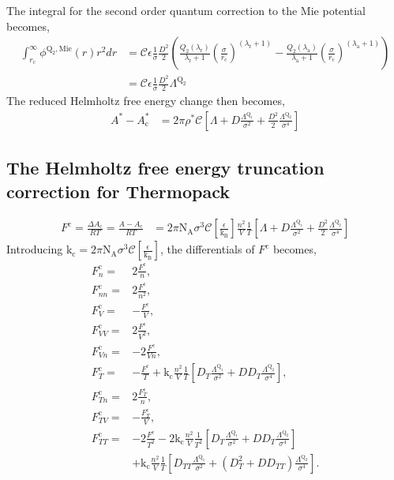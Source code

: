 \documentclass[english]{../thermomemo/thermomemo}
\newcommand*{\lb}{\left(}
\newcommand*{\rb}{\right)}
\newcommand{\mie}{\text{Mie}\xspace}
\newcommand{\lama}{\ensuremath{{\lambda_{\text{a}}}}\xspace}
\newcommand{\lamr}{\ensuremath{{\lambda_{\text{r}}}}\xspace}
\newcommand{\NA}{\ensuremath{\text{N}_{\text{A}}}\xspace}
\newcommand{\KB}{\ensuremath{\text{k}_{\text{B}}}\xspace}
\newcommand{\cut}{\ensuremath{\text{c}}\xspace}
\newcommand{\Qone}{\ensuremath{\text{Q}_1}\xspace}
\newcommand{\Qtwo}{\ensuremath{\text{Q}_2}\xspace}
\newcommand{\kF}{\ensuremath{\text{k}_\text{c}}\xspace}
\begin{document}
The integral for the second order quantum correction to the Mie potential becomes,
\begin{align}
  \label{eq:i_mie_q2}
  \int_{r_\cut}^\infty \phi^{\Qtwo,\mie}\lb r\rb r^2 dr &= \mathcal{C}\epsilon \frac{1}{\sigma} \frac{D^2}{2}
  \lb \frac{Q_2\lb\lamr\rb}{\lamr+1}\lb\frac{\sigma}{r_\cut} \rb^{\lb\lamr+1\rb} - \frac{Q_2\lb\lama\rb}{\lama+1}\lb\frac{\sigma}{r_\cut} \rb^{\lb \lama + 1\rb} \rb\\
  &= \mathcal{C}\epsilon \frac{1}{\sigma} \frac{D^2}{2} \Lambda^{\Qtwo}
\end{align}
The reduced Helmholtz free energy change then becomes,
\begin{align}
  \label{eq:dAred}
  A^* - A_\cut^* &= 2 \pi \rho^* \mathcal{C} \left[ \Lambda + D \frac{\Lambda^{\Qone}}{\sigma^2}
    + \frac{D^2}{2} \frac{\Lambda^{\Qtwo}}{\sigma^4} \right]
\end{align}
\subsection{The Helmholtz free energy truncation correction for Thermopack}
\begin{align}
  \label{eq:dA_RT}
  F^\cut = \frac{\Delta A_\cut}{R T} = \frac{A - A_\cut}{R T} &= 2 \pi \NA \sigma^3 \mathcal{C} \left[\frac{\epsilon}{\KB}\right] \frac{n^2}{V} \frac{1}{T} \left[ \Lambda + D \frac{\Lambda^{\Qone}}{\sigma^2}
    + \frac{D^2}{2} \frac{\Lambda^{\Qtwo}}{\sigma^4} \right]
\end{align}
Introducing $\kF = 2 \pi \NA \sigma^3 \mathcal{C}
\left[\frac{\epsilon}{\KB}\right]$, the differentials of $F^\cut$ becomes,
\begin{align}
  \label{eq:dF}
  F^\cut_n =& 2 \frac{F^\cut}{n}, \\
  F^\cut_{nn} =& 2 \frac{F^\cut}{n^2}, \\
  F^\cut_{V} =& - \frac{F^\cut}{V}, \\
  F^\cut_{VV} =& 2 \frac{F^\cut}{V^2}, \\
  F^\cut_{Vn} =&  -2 \frac{F^\cut}{V n}, \\
  F^\cut_{T} =& - \frac{F^\cut}{T} + \kF \frac{n^2}{V} \frac{1}{T} \left[ D_{T} \frac{\Lambda^{\Qone}}{\sigma^2}
    + D D_{T} \frac{\Lambda^{\Qtwo}}{\sigma^4} \right], \\
  F^\cut_{Tn} =&  2 \frac{F^\cut_T}{n}, \\
  F^\cut_{TV} =&  - \frac{F^\cut_T}{V}, \\
  F^\cut_{TT} =& - 2 \frac{F^\cut}{T^2} -  2 \kF \frac{n^2}{V} \frac{1}{T^2} \left[ D_{T} \frac{\Lambda^{\Qone}}{\sigma^2}
    + D D_{T} \frac{\Lambda^{\Qtwo}}{\sigma^4} \right]  \nonumber \\ & + \kF \frac{n^2}{V} \frac{1}{T} \left[ D_{TT} \frac{\Lambda^{\Qone}}{\sigma^2} +
    \lb D_{T}^2 + D D_{TT} \rb \frac{\Lambda^{\Qtwo}}{\sigma^4} \right].
\end{align}
\end{document}
